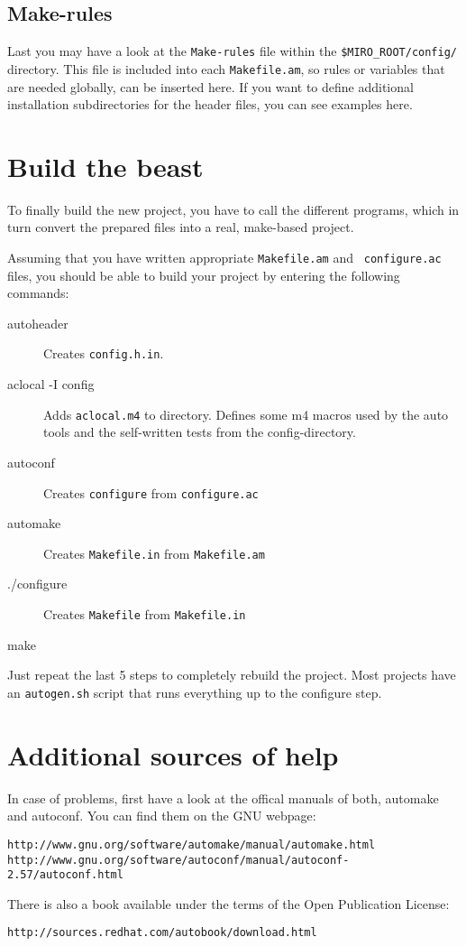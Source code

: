 \subsection{Make-rules}
Last you may have a look at the \texttt{Make-rules} file within the
\texttt{\$MIRO\_ROOT/\-config/} directory. This file is included into each
\texttt{Makefile.am}, so rules or variables that are needed globally,
can be inserted here. If you want to define additional installation
subdirectories for the header files, you can see examples here.

\section{Build the beast}

To finally build the new project, you have to call the different
programs, which in turn convert the prepared files into a real,
make-based project.

Assuming that you have written appropriate {\tt Makefile.am} and {\tt
configure.ac} files, you should be able to build your project by
entering the following commands:

\begin{description}
\item[autoheader] Creates \texttt{config.h.in}.
\item[aclocal -I config] Adds \texttt{aclocal.m4} to directory.
  Defines some m4 macros used by the auto tools and the self-written
  tests from the config-directory.

\item[autoconf] Creates \texttt{configure} from \texttt{configure.ac}
\item[automake] Creates \texttt{Makefile.in} from \texttt{Makefile.am} 
\item[./\-configure] Creates \texttt{Makefile} from \texttt{Makefile.in}
\item[make]
\end{description}

Just repeat the last 5 steps to completely rebuild the project. Most
projects have an \texttt{autogen.sh} script that runs everything up to
the configure step.


\section{Additional sources of help}

In case of problems, first have a look at the offical manuals of both,
automake and autoconf. You can find them on the GNU webpage:

\begin{verbatim}
http://www.gnu.org/software/automake/manual/automake.html
http://www.gnu.org/software/autoconf/manual/autoconf-2.57/autoconf.html
\end{verbatim}

There is also a book available under the terms of the Open Publication
License:

\begin{verbatim}
http://sources.redhat.com/autobook/download.html
\end{verbatim}

